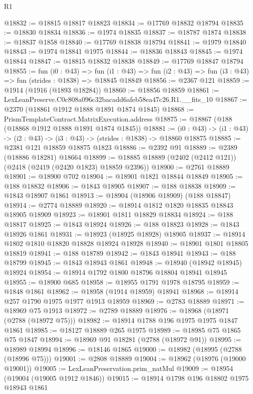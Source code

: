 \begin{lexlean}{R1}
\begin{coremodule}
@18832 := @18815 @18817 @18823
@18834 := @17769 @18832 @18794
@18835 := @18830 @18834
@18836 := @1974 @18835
@18837 := @18787 @1874
@18838 := @18837 @1858
@18840 := @17769 @18838 @18794
@18841 := @1979 @18840
@18843 := @1974 @18841 @1975
@18844 := @18836 @18843
@18845 := @1974 @18844
@18847 := @18815 @18832 @18838
@18849 := @17769 @18847 @18794
@18855 := fun (i0 : @43) =>
  fun (i1 : @43) => fun (i2 : @43) => fun (i3 : @43) => fun (strides : @1838) => @18845 @18849
@18856 := @2367 @121
@18859 := @1914 (@1916 (@1893 @18284))
@18860 := @18856 @18859
@18861 := LexLeanPreserve.C0c808a096c32bacadd6afeb58ea47c26.R1.__fits_10
@18867 := @2370 (@18861 @1912 @1888 @1891 @1874 @1845)
@18868 := PrismTemplateContract.MatrixExecution.address
@18875 := @18867 (@188 (@18868 @1912 @1888 @1891 @1874 @1845))
@18881 := (i0 : @43) -> (i1 : @43) -> (i2 : @43) -> (i3 : @43) -> (strides : @1838) -> @18860 @18875
@18885 := @2381 @121 @18859 @18875 @1823
@18886 := @2392 @91
@18889 := @2389 (@18886 @18281) @18664
@18899 := @18885 @18889 (@2402 (@2412 @121)) (@2418 (@2419 (@2420 @1823) @18859 @2396))
@18900 := @2761 @18889
@18901 := @18900 @702
@18904 := @18901 @1821 @18844 @18849
@18905 := @188 @18832
@18906 := @1843 @18905
@18907 := @188 @18838
@18909 := @1843 @18907 @1861
@18913 := @18904 (@18906 @18909) (@188 @18847)
@18914 := @2774 @18889
@18920 := @18914 @1812 @1820 @18835 @18843 @18905 @18909
@18923 := @18901 @1811 @18829 @18834
@18924 := @188 @18817
@18925 := @1843 @18924
@18926 := @188 @18823
@18928 := @1843 @18926 @1861
@18931 := @18923 (@18925 @18928) @18905
@18937 := @18914 @1802 @1810 @18820 @18828 @18924 @18928
@18940 := @18901 @1801 @18805 @18819
@18941 := @188 @18789
@18942 := @1843 @18941
@18943 := @188 @18799
@18945 := @1843 @18943 @1861
@18948 := @18940 (@18942 @18945) @18924
@18954 := @18914 @1792 @1800 @18796 @18804 @18941 @18945
@18955 := @18900 @685
@18958 := @18955 @1791 @1978 @18795
@18959 := @1848 @1861
@18962 := @18958 (@1914 @18959) @18941
@18968 := @18914 @257 @1790 @1975 @1977 @1913 @18959
@18969 := @2783 @18889
@18971 := @18969 @75 @1913
@18972 := @2789 @18889
@18976 := @18968 (@18971 (@2788 (@18972 @75)))
@18982 := @18914 @1788 @196 @1975 @1975 @1847 @1861
@18985 := @18127 @18889 @265 @1975
@18989 := @18985 @75 @1865 @75 @1847
@18994 := @18969 @91 @18281 (@2788 (@18972 @91))
@18995 := @18989 @18994
@18996 := @18146 @1865
@19000 := @18982 (@18995 (@2788 (@18996 @75)))
@19001 := @2808 @18889
@19004 := @18962 (@18976 (@19000 @19001))
@19005 := LexLeanPreservation.prim_natMul
@19009 := @18954 (@19004 (@19005 @1912 @1846))
@19015 := @18914 @1798 @196 @18802 @1975 @18943 @1861

\end{coremodule}
\end{lexlean}
